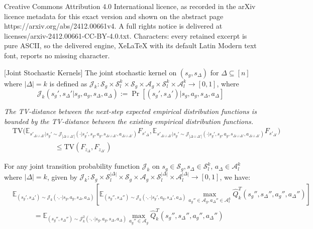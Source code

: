 \documentclass[10pt,a4paper]{amsart}
\def\E{\mathbb{E}}
\begin{document}
Creative Commons Attribution 4.0 International licence, as recorded in the arXiv licence metadata for this exact version and shown on the abstract page https://arxiv.org/abs/2412.00661v4. A full rights notice is delivered at licenses/arxiv-2412.00661-CC-BY-4.0.txt. Characters: every retained excerpt is pure ASCII, so the delivered engine, XeLaTeX with its default Latin Modern text font, reports no missing character.
\begin{definition}\label{definition: joint_transition_probability}[Joint Stochastic Kernels] The joint stochastic kernel on $(s_g,s_\Delta)$ for $\Delta\subseteq [n]$ where $|\Delta|=k$ is defined as $\mathcal{J}_k:\mathcal{S}_g\times\mathcal{S}_l^{k}\times\mathcal{S}_g\times\mathcal{A}_g\times\mathcal{S}_l^{k}\times\mathcal{A}_l^k\to[0,1]$, where \begin{equation}\mathcal{J}_k(s_g',s_\Delta'|s_g, a_g, s_\Delta, a_\Delta) := \Pr[(s_g',s_\Delta')|s_g, a_g, s_\Delta,a_\Delta]\end{equation}
\end{definition}

\begin{lemma}\label{tv_s_to_z_bound}\emph{The TV-distance between the next-step expected empirical distribution functions is bounded by the TV-distance between the existing empirical distribution functions.}
    \begin{align*}
&\mathrm{TV}\bigg(\E_{s'_{\Delta\cup\Delta'}|s_g' \sim \mathcal{J}_{|\Delta\cup\Delta'|}(\cdot|s_g',s_g,a_g,s_{\Delta\cup\Delta'},a_{\Delta\cup\Delta'})}F_{s'_\Delta},\E_{s'_{\Delta\cup\Delta'}|s_g' \sim \mathcal{J}_{|\Delta\cup\Delta'|}(\cdot|s_g',s_g,a_g,s_{\Delta\cup\Delta'},a_{\Delta\cup\Delta'})}F_{s'_{\Delta'}}\bigg) \\&\quad\quad\quad\quad\quad\quad \leq \mathrm{TV}(F_{z_\Delta}, F_{z_{\Delta'}})
    \end{align*}
\end{lemma}

\begin{lemma}\label{lemma: combining transition probabilities}
For any joint transition probability function $\mathcal{J}_k$ on $s_g\in\mathcal{S}_g, s_\Delta\in\mathcal{S}_l^k$, $a_\Delta\in\mathcal{A}_l^k$ where $|\Delta|=k$, given by $\mathcal{J}_k:\mathcal{S}_g\times\mathcal{S}_l^{|\Delta|}\times\mathcal{S}_g\times\mathcal{A}_g\times\mathcal{S}_l^{|\Delta|}\times\mathcal{A}_l^{|\Delta|}\to [0,1]$, we have:
\begin{align*}
&\E_{(s_g',s_\Delta')\sim\mathcal{J}_k(\cdot,\cdot|s_g,a_g,s_\Delta,a_\Delta)}\left[\E_{(s_g'',s_\Delta'')\sim\mathcal{J}_k(\cdot,\cdot|s_g',a_g,s_\Delta',a_\Delta)} \max_{a_g''\in\mathcal{A}_g,a_\Delta''\in\mathcal{A}_l^k}\hat{Q}_k^T(s_g'',s_\Delta'',a_g'',a_\Delta'')\right] \\ 
&\quad\quad\quad= \E_{(s_g'',s_\Delta'')\sim\mathcal{J}_k^2(\cdot,\cdot|s_g,a_g,s_\Delta,a_\Delta)} \max_{a_g''\in\mathcal{A}_g}\hat{Q}_{k}^T(s_g'',s_\Delta'',a_g'',a_\Delta'')
\end{align*}
\end{lemma}
\end{document}
